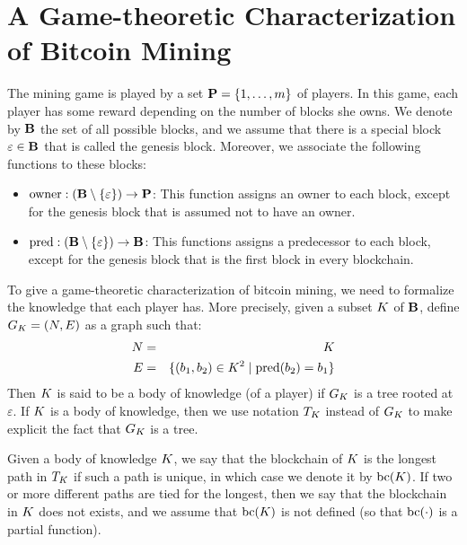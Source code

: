 \documentclass{article}
\begin{document}


\section{A Game-theoretic Characterization of Bitcoin Mining}

The mining game is played by a set $\mathbf{P} = \{1, \ldots, m\}$ of players. In this game, each player has some reward depending on the number of blocks she owns. We denote by $\mathbf{B}$ the set of all possible blocks, and we assume that there is a special block $\varepsilon \in \mathbf{B}$ that is called the genesis block. Moreover, we associate the following functions to these blocks:
\begin{itemize}
\item $\text{owner} : (\mathbf{B} \setminus \{\varepsilon\}) \to \mathbf{P}$: This function assigns an owner to each block, except for the genesis block that is assumed not to have an owner.

\item $\text{pred} : (\text{\bf B} \setminus \{\varepsilon\}) \to \text{\bf B}$: This functions assigns a predecessor to each block, except for the genesis block that is the first block in every blockchain.
\end{itemize}
To give a game-theoretic characterization of bitcoin mining, we need to formalize the knowledge that each player has. More precisely, given a subset $K$ of $\mathbf{B}$, define $G_K = (N,E)$ as a graph such that:
\begin{eqnarray*}
N &=& K\\
E &=& \{ (b_1,b_2) \in K^2 \mid \text{pred}(b_2) = b_1\}
\end{eqnarray*}
Then $K$ is said to be a body of knowledge (of a player) if $G_K$ is a tree rooted at $\varepsilon$. If $K$ is a body of knowledge, then we use notation $T_K$ instead of $G_K$ to make explicit the fact that $G_K$ is a tree.

Given a body of knowledge $K$, we say that the blockchain of $K$ is the longest path in $T_K$ if such a path is unique, in which case we denote it by $\text{bc}(K)$. If two or more different paths are tied for the longest, then we say that the blockchain in $K$ does not exists, and we assume that $\text{bc}(K)$ is not defined (so that $\text{bc}(\cdot)$ is a partial function).
\end{document}
